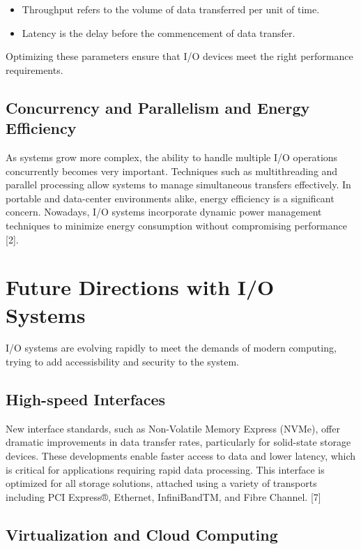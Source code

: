 \documentclass[a4paper]{article}
\begin{document}
\begin{itemize}
    \item Throughput refers to the volume of data transferred per unit of time.
    \item Latency is the delay before the commencement of data transfer.
\end{itemize}
Optimizing these parameters ensure that I/O devices meet the right performance requirements.


\subsection{Concurrency and Parallelism and Energy Efficiency}

As systems grow more complex, the ability to handle multiple I/O operations
 concurrently becomes very important. Techniques such as multithreading and 
 parallel processing allow systems to manage simultaneous transfers effectively.
 In portable and data-center environments alike, energy efficiency is a significant concern.
  Nowadays, I/O systems incorporate dynamic power management techniques to minimize energy 
  consumption without compromising performance [2].

\section{Future Directions with I/O Systems}

I/O systems are evolving rapidly to meet the demands of modern computing, trying to add accessisbility and security to the system.

\subsection{High-speed Interfaces}

New interface standards, such as Non-Volatile Memory Express (NVMe),
offer dramatic improvements in data transfer rates, particularly for solid-state storage devices.
These developments enable faster access to data and lower latency, which is critical for applications 
requiring rapid data processing. This interface is optimized for all storage solutions, attached using a variety
of transports including PCI Express®, Ethernet, InfiniBandTM, and Fibre Channel. [7]

\subsection{Virtualization and Cloud Computing}
\end{document}
